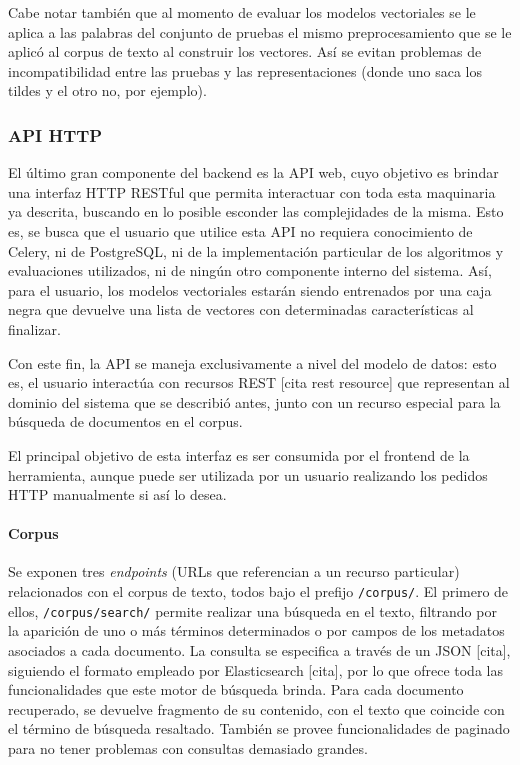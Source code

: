 \quad

Cabe notar también que al momento de evaluar los modelos vectoriales se le aplica a las palabras del
conjunto de pruebas el mismo preprocesamiento que se le aplicó al corpus de texto al construir los
vectores. Así se evitan problemas de incompatibilidad entre las pruebas y las representaciones
(donde uno saca los tildes y el otro no, por ejemplo).


\subsubsection{API HTTP}

El último gran componente del backend es la API web, cuyo objetivo es brindar una interfaz HTTP
RESTful que permita interactuar con toda esta maquinaria ya descrita, buscando en lo posible
esconder las complejidades de la misma. Esto es, se busca que el usuario que utilice esta API no
requiera conocimiento de Celery, ni de PostgreSQL, ni de la implementación particular de los
algoritmos y evaluaciones utilizados, ni de ningún otro componente interno del sistema. Así, para el
usuario, los modelos vectoriales estarán siendo entrenados por una caja negra que devuelve una lista
de vectores con determinadas características al finalizar.

Con este fin, la API se maneja exclusivamente a nivel del modelo de datos: esto es, el usuario
interactúa con recursos REST [cita rest resource] que representan al dominio del sistema que se
describió antes, junto con un recurso especial para la búsqueda de documentos en el corpus.

El principal objetivo de esta interfaz es ser consumida por el frontend de la herramienta, aunque
puede ser utilizada por un usuario realizando los pedidos HTTP manualmente si así lo desea.


\paragraph{Corpus}

Se exponen tres \textit{endpoints} (URLs que referencian a un recurso particular) relacionados con
el corpus de texto, todos bajo el prefijo \texttt{/corpus/}. El primero de ellos,
\texttt{/corpus/search/} permite realizar una búsqueda en el texto, filtrando por la aparición de
uno o más términos determinados o por campos de los metadatos asociados a cada documento. La
consulta se especifica a través de un JSON [cita], siguiendo el formato empleado por Elasticsearch
[cita], por lo que ofrece toda las funcionalidades que este motor de búsqueda brinda. Para cada
documento recuperado, se devuelve fragmento de su contenido, con el texto que coincide con el
término de búsqueda resaltado. También se provee funcionalidades de paginado para no tener problemas
con consultas demasiado grandes.

